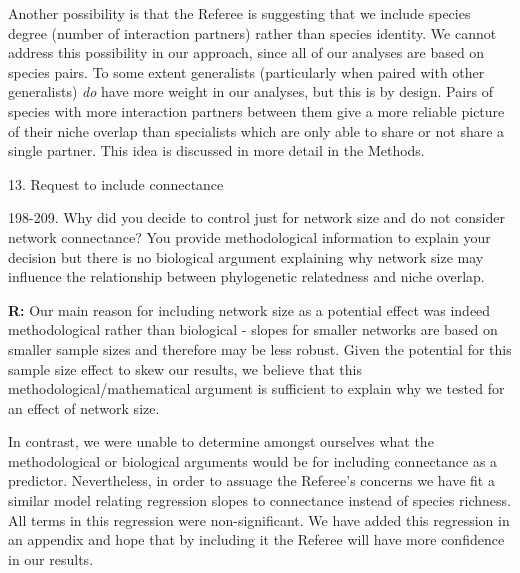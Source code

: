 \documentclass[12pt]{letter}
\newenvironment{refquote}{\bigskip \begin{it}}{\end{it}\smallskip}
\providecommand{\DIFdelbegin}{} %
\providecommand{\DIFdelend}{} %
\newcommand{\DIFscaledelfig}{0.5}
\newlength{\DIFdelgraphicswidth} %
\newlength{\DIFdelgraphicsheight} %
\newcommand{\DIFdelincludegraphics}[2][]{%
\sbox{\DIFdelgraphicsbox}{\DIFOincludegraphics[#1]{#2}}%
\settoboxwidth{\DIFdelgraphicswidth}{\DIFdelgraphicsbox} %
\settoboxtotalheight{\DIFdelgraphicsheight}{\DIFdelgraphicsbox} %
\scalebox{\DIFscaledelfig}{%
\parbox[b]{\DIFdelgraphicswidth}{\usebox{\DIFdelgraphicsbox}\\[-\baselineskip] \rule{\DIFdelgraphicswidth}{0em}}\llap{\resizebox{\DIFdelgraphicswidth}{\DIFdelgraphicsheight}{%
\setlength{\unitlength}{\DIFdelgraphicswidth}%
\begin{picture}(1,1)%
\thicklines\linethickness{2pt} %
{\color[rgb]{1,0,0}\put(0,0){\framebox(1,1){}}}%
{\color[rgb]{1,0,0}\put(0,0){\line( 1,1){1}}}%
{\color[rgb]{1,0,0}\put(0,1){\line(1,-1){1}}}%
\end{picture}%
}\hspace*{3pt}}} %
} %
\DeclareRobustCommand{\DIFdelbegin}{\DIFOdelbegin \let\includegraphics\DIFdelincludegraphics} %
\DeclareRobustCommand{\DIFdelend}{\DIFOaddend \let\includegraphics\DIFOincludegraphics} %
\begin{document}
		Another possibility is that the Referee is suggesting that we include species degree (number of interaction partners) rather than species identity. We cannot address this possibility in our approach, since all of our analyses are based on species pairs. To some extent generalists (particularly when paired with other generalists) \emph{do} have more weight in our analyses, but this is by design. Pairs of species with more interaction partners between them give a more reliable picture of their niche overlap than specialists which are only able to share or not share a single partner. This idea is discussed in more detail in the Methods. 



\DIFdelbegin %

\DIFdelend 13. Request to include connectance

		\begin{refquote}
			198-209. Why did you decide to control just for network size and do not consider network connectance? You provide methodological information to explain your decision but there is no biological argument explaining why network size may influence the relationship between phylogenetic relatedness and niche overlap.
		\end{refquote}

		\textbf{R:} Our main reason for including network size as a potential effect was indeed methodological rather than biological - slopes for smaller networks are based on smaller sample sizes and therefore may be less robust. 
		Given the potential for this sample size effect to skew our results, we believe that this methodological/mathematical argument is sufficient to explain why we tested for an effect of network size.


		In contrast, we were unable to determine amongst ourselves what the methodological or biological arguments would be for including connectance as a predictor. Nevertheless, in order to assuage the Referee's concerns we have fit a similar model relating regression slopes to connectance instead of species richness. All terms in this regression were non-significant. We have added this regression in an appendix and hope that by including it the Referee will have more confidence in our results.
\end{document}
